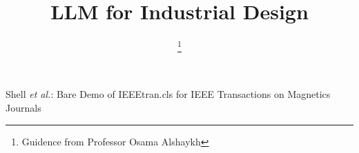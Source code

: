 \documentclass[journal,transmag]{IEEEtran}
\begin{document}
%
\title{LLM for Industrial Design}




\author{
\thanks{Guidence from Professor Osama Alshaykh}}



%
{Shell \MakeLowercase{\textit{et al.}}: Bare Demo of IEEEtran.cls for IEEE Transactions on Magnetics Journals}
% 







\end{document}
